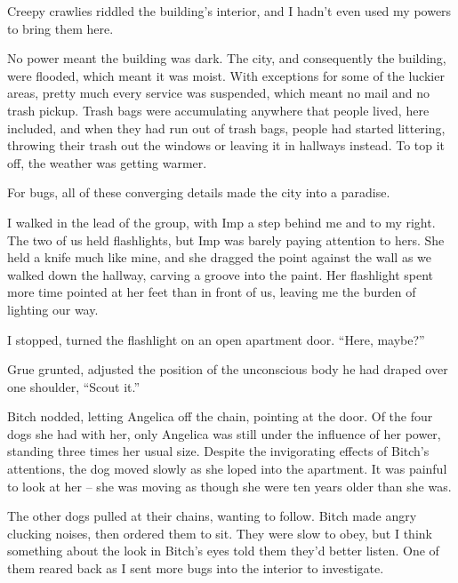





Creepy crawlies riddled the building's interior, and I hadn't even used my powers to bring them here.



No power meant the building was dark.  The city, and consequently the building, were flooded, which meant it was moist.  With exceptions for some of the luckier areas, pretty much every service was suspended, which meant no mail and no trash pickup.  Trash bags were accumulating anywhere that people lived, here included, and when they had run out of trash bags, people had started littering, throwing their trash out the windows or leaving it in hallways instead.  To top it off, the weather was getting warmer.



For bugs, all of these converging details made the city into a paradise.



I walked in the lead of the group, with Imp a step behind me and to my right.  The two of us held flashlights, but Imp was barely paying attention to hers.  She held a knife much like mine, and she dragged the point against the wall as we walked down the hallway, carving a groove into the paint.  Her flashlight spent more time pointed at her feet than in front of us, leaving me the burden of lighting our way.



I stopped, turned the flashlight on an open apartment door.  ``Here, maybe?''



Grue grunted, adjusted the position of the unconscious body he had draped over one shoulder, ``Scout it.''



Bitch nodded, letting Angelica off the chain, pointing at the door.  Of the four dogs she had with her, only Angelica was still under the influence of her power, standing three times her usual size.  Despite the invigorating effects of Bitch's attentions, the dog moved slowly as she loped into the apartment.  It was painful to look at her – she was moving as though she were ten years older than she was.



The other dogs pulled at their chains, wanting to follow.  Bitch made angry clucking noises, then ordered them to sit.  They were slow to obey, but I think something about the look in Bitch's eyes told them they'd better listen.  One of them reared back as I sent more bugs into the interior to investigate.



